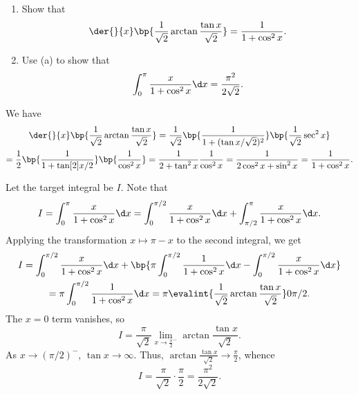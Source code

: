 \begin{problem}
    \begin{enumerate}
        \item Show that \[\der{}{x} \bp{\frac1{\sqrt2} \arctan \frac{\tan x}{\sqrt2}} = \frac1{1 + \cos^2 x}.\]
        \item Use (a) to show that \[\int_0^\pi \frac{x}{1 + \cos^2 x} \d x = \frac{\pi^2}{2\sqrt2}.\]
    \end{enumerate}
\end{problem}
\begin{solution}
    \begin{ppart}
        We have
        \begin{gather*}
            \der{}{x} \bp{\frac1{\sqrt2} \arctan \frac{\tan x}{\sqrt2}} = \frac1{\sqrt2} \bp{\frac1{1 + (\tan x/\sqrt2)^2}} \bp{\frac1{\sqrt2} \sec^2 x}\\
            = \frac12 \bp{\frac1{1 + \tan[2]{x}/2}} \bp{\frac1{\cos^2 x}} = \frac1{2 + \tan^2 x} \frac{1}{\cos^2 x} =\frac1{2\cos^2 x + \sin^2 x} = \frac1{1 + \cos^2 x}.
        \end{gather*}
    \end{ppart}
    \begin{ppart}
        Let the target integral be $I$. Note that \[I = \int_0^\pi \frac{x}{1 + \cos^2 x} \d x = \int_0^{\pi/2} \frac{x}{1 + \cos^2 x} \d x + \int_{\pi/2}^\pi \frac{x}{1 + \cos^2 x} \d x.\] Applying the transformation $x \mapsto \pi -x$ to the second integral, we get
        \begin{gather*}
            I = \int_0^{\pi/2} \frac{x}{1 + \cos^2 x} \d x + \bp{\pi \int_0^{\pi/2} \frac{1}{1 + \cos^2 x} \d x - \int_0^{\pi/2} \frac{x}{1 + \cos^2 x} \d x}\\
            = \pi\int_0^{\pi/2} \frac{1}{1 + \cos^2 x} \d x = \pi \evalint{\frac1{\sqrt2} \arctan \frac{\tan x}{\sqrt2}}0{\pi/2}.
        \end{gather*}
        The $x = 0$ term vanishes, so \[I = \frac{\pi}{\sqrt2} \lim_{x \to \frac\pi2^{-}} \arctan \frac{\tan x}{\sqrt2}.\] As $x \to (\pi/2)^-$, $\tan x \to \infty$. Thus, $\arctan \frac{\tan x}{\sqrt2} \to \frac\pi2$, whence \[I = \frac{\pi}{\sqrt2} \cdot \frac{\pi}{2} = \frac{\pi^2}{2\sqrt2}.\]
    \end{ppart}
\end{solution}

